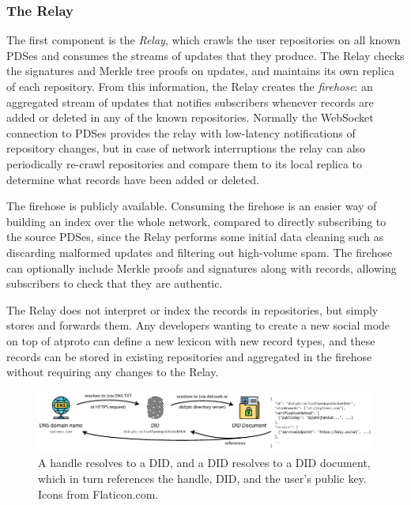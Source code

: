 \documentclass[sigconf]{acmart}
\begin{document}
\subsubsection{The Relay}\label{sec:relay}

The first component is the \emph{Relay}, which crawls the user repositories on all known PDSes and consumes the streams of updates that they produce.
The Relay checks the signatures and Merkle tree proofs on updates, and maintains its own replica of each repository.
From this information, the Relay creates the \emph{firehose}: an aggregated stream of updates that notifies subscribers whenever records are added or deleted in any of the known repositories.
Normally the WebSocket connection to PDSes provides the relay with low-latency notifications of repository changes, but in case of network interruptions the relay can also periodically re-crawl repositories and compare them to its local replica to determine what records have been added or deleted.

The firehose is publicly available.
Consuming the firehose is an easier way of building an index over the whole network, compared to directly subscribing to the source PDSes, since the Relay performs some initial data cleaning such as discarding malformed updates and filtering out high-volume spam.
The firehose can optionally include Merkle proofs and signatures along with records, allowing subscribers to check that they are authentic.

The Relay does not interpret or index the records in repositories, but simply stores and forwards them.
Any developers wanting to create a new social mode on top of atproto can define a new lexicon with new record types, and these records can be stored in existing repositories and aggregated in the firehose without requiring any changes to the Relay.

\begin{figure}
    \centering
    \includegraphics[width=\linewidth]{identity.pdf}
    \caption{A handle resolves to a DID, and a DID resolves to a DID document, which in turn references the handle, DID, and the user's public key. Icons from Flaticon.com.}
    \label{fig:identity}
\end{figure}
\end{document}
